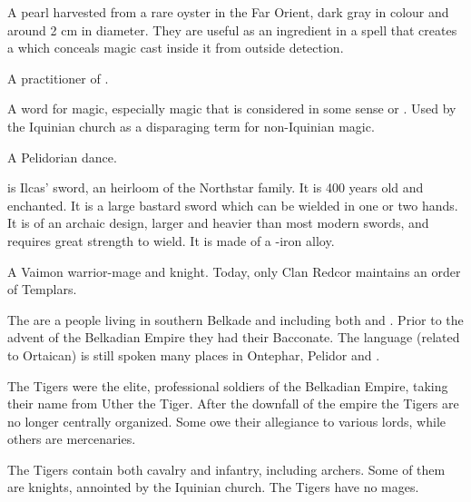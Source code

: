 \begin{gloss}
A pearl harvested from a rare oyster in the Far Orient, dark gray in colour and around 2 cm in diameter. They are useful as an ingredient in a spell that creates a  which conceals magic cast inside it from outside detection. 



A practitioner of . 



A word for magic, especially magic that is considered in some sense  or . Used by the Iquinian church as a disparaging term for non-Iquinian magic. 



A Pelidorian dance.



\gitem{\Telderain{}}
\Telderain{} is Ilcas' sword, an heirloom of the Northstar family. It is 400 years old and enchanted. It is a large bastard sword which can be wielded in one or two hands. It is of an archaic design, larger and heavier than most modern swords, and requires great strength to wield. It is made of a \dragonsteel-iron alloy. 



A Vaimon warrior-mage and knight. %
Today, only Clan Redcor maintains an order of Templars. 






\gitempl{\Tepharite{}}{\Tepharites{}}
The \Tepharites{} are a people living in southern Belkade and including both \scathae{} and \humans{}. Prior to the advent of the Belkadian Empire they had their \Tepharin{} Bacconate. The \Tepharin{} language (related to Ortaican) is still spoken many places in Ontephar, Pelidor and \Scyrum. 



The Tigers were the elite, professional soldiers of the Belkadian Empire, taking their name from Uther the Tiger. After the downfall of the empire the Tigers are no longer centrally organized. Some owe their allegiance to various lords, while others are mercenaries. 

The Tigers contain both cavalry and infantry, including archers. Some of them are knights, annointed by the Iquinian church. The Tigers have no mages. 




\end{gloss}
